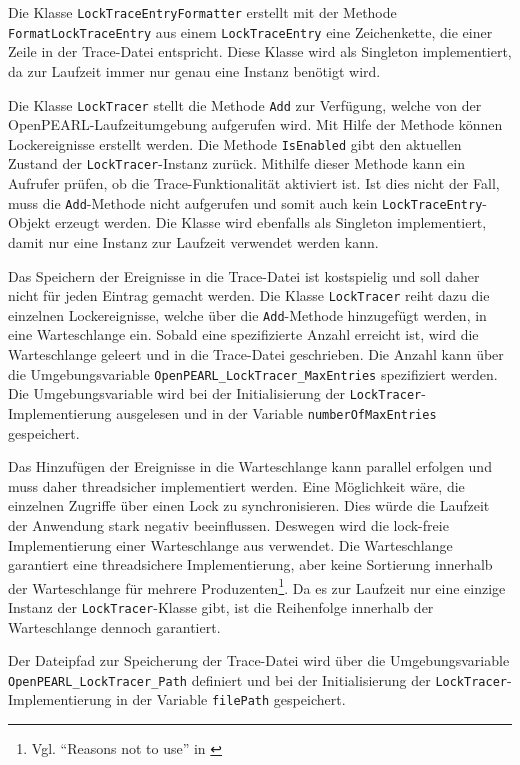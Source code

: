 Die Klasse \texttt{Lock\-Trace\-Entry\-Formatter} erstellt mit der Methode
\texttt{Format\-Lock\-Trace\-Entry} aus einem \texttt{Lock\-Trace\-Entry} eine
Zeichenkette, die einer Zeile in der Trace-Datei entspricht. Diese Klasse wird
als Singleton implementiert, da zur Laufzeit immer nur genau eine Instanz
benötigt wird.

Die Klasse \texttt{Lock\-Tracer} stellt die Methode \texttt{Add} zur Verfügung,
welche von der OpenPEARL-Laufzeitumgebung aufgerufen wird. Mit Hilfe der Methode
können Lockereignisse erstellt werden. Die Methode \texttt{IsEnabled} gibt den
aktuellen Zustand der \texttt{Lock\-Tracer}-Instanz zurück. Mithilfe dieser
Methode kann ein Aufrufer prüfen, ob die Trace-Funktionalität aktiviert ist. Ist
dies nicht der Fall, muss die \texttt{Add}-Methode nicht aufgerufen und somit
auch kein \texttt{Lock\-Trace\-Entry}-Objekt erzeugt werden. Die Klasse wird
ebenfalls als Singleton implementiert, damit nur eine Instanz zur Laufzeit
verwendet werden kann.

Das Speichern der Ereignisse in die Trace-Datei ist kostspielig und soll daher
nicht für jeden Eintrag gemacht werden. Die Klasse \texttt{Lock\-Tracer} reiht
dazu die einzelnen Lockereignisse, welche über die \texttt{Add}-Methode
hinzugefügt werden, in eine Warteschlange ein. Sobald eine spezifizierte Anzahl
erreicht ist, wird die Warteschlange geleert und in die Trace-Datei geschrieben.
Die Anzahl kann über die Umgebungsvariable
\texttt{OpenPEARL\_LockTracer\_MaxEntries} spezifiziert werden. Die
Umgebungsvariable wird bei der Initialisierung der
\texttt{Lock\-Tracer}-Implementierung ausgelesen und in der Variable
\texttt{number\-Of\-Max\-Entries} gespeichert.

Das Hinzufügen der Ereignisse in die Warteschlange kann parallel erfolgen und
muss daher threadsicher implementiert werden. Eine Möglichkeit wäre, die
einzelnen Zugriffe über einen Lock zu synchronisieren. Dies würde die Laufzeit
der Anwendung stark negativ beeinflussen. Deswegen wird die lock-freie
Implementierung einer Warteschlange aus \autocite{Moody_Camels_Concurrentqueue}
verwendet. Die Warteschlange garantiert eine threadsichere Implementierung, aber
keine Sortierung innerhalb der Warteschlange für mehrere
Produzenten\footnote{Vgl. "`Reasons not to use"' in
\autocite{Moody_Camels_Concurrentqueue}}. Da es zur Laufzeit nur eine einzige
Instanz der \texttt{Lock\-Tracer}-Klasse gibt, ist die Reihenfolge innerhalb der
Warteschlange dennoch garantiert.

Der Dateipfad zur Speicherung der Trace-Datei wird über die Umgebungsvariable
\texttt{OpenPEARL\_LockTracer\_Path} definiert und bei der Initialisierung der
\texttt{LockTracer}-Implementierung in der Variable \texttt{filePath}
gespeichert.

